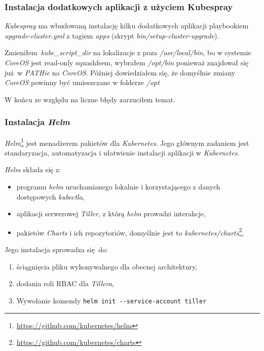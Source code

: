 \documentclass[a4paper,12pt,twoside,openany]{report}
\providecommand{\tightlist}{%
  \setlength{\itemsep}{0pt}\setlength{\parskip}{0pt}}
\DeclareRobustCommand{\href}[2]{#2\footnote{\url{#1}}}
\newcommand{\passthrough}[1]{#1}
\begin{document}
\hypertarget{instalacja-dodatkowych-aplikacji-z-uux17cyciem-kubespray}{%
\subsubsection{Instalacja dodatkowych aplikacji z użyciem
Kubespray}\label{instalacja-dodatkowych-aplikacji-z-uux17cyciem-kubespray}}

\emph{Kubespray} ma wbudowaną instalację kilku dodatkowych aplikacji
playbookiem \emph{upgrade-cluster.yml} z tagiem \emph{apps} (skrypt
\emph{bin/setup-cluster-upgrade}).

Zmieniłem~\emph{kube\_script\_dir} na lokalizacje z poza
\emph{/usr/local/bin}, bo w systemie \emph{CoreOS} jest read-only
squashfsem, wybrałem \emph{/opt/bin} ponieważ znajdował się już~w
\emph{PATHie} na \emph{CoreOS}. Później dowiedziałem się, że domyślnie
zmiany \emph{CoreOS} powinny być umieszczane w folderze \emph{/opt}

W końcu ze względu na liczne błędy zarzuciłem temat.

\hypertarget{instalacja-helm}{%
\subsubsection{\texorpdfstring{Instalacja
\emph{Helm}}{Instalacja Helm}}\label{instalacja-helm}}

\href{https://github.com/kubernetes/helm}{\emph{Helm}} jest menadżerem
pakietów dla \emph{Kubernetes}. Jego głównym zadaniem jest
standaryzacja, automatyzacja i ułatwienie instalacji aplikacji w
\emph{Kubernetes}.

\emph{Helm} składa się z:

\begin{itemize}
\tightlist
\item
  programu \emph{helm} uruchamianego lokalnie i korzystającego z danych
  dostępowych \emph{kubectla},
\item
  aplikacji serwerowej \emph{Tiller}, z którą \emph{helm} prowadzi
  interakcje,
\item
  pakietów \emph{Charts} i ich repozytoriów, domyślnie jest to
  \href{https://github.com/kubernetes/charts}{\emph{kubernetes/charts}},
\end{itemize}

Jego instalacja sprowadza się~do:

\begin{enumerate}
\def\labelenumi{\arabic{enumi}.}
\tightlist
\item
  ściągnięcia pliku wykonywalnego dla obecnej architektury,
\item
  dodania roli RBAC dla \emph{Tillera},
\item
  Wywołanie komendy
  \passthrough{\lstinline!helm init --service-account tiller!}
\end{enumerate}
\end{document}

